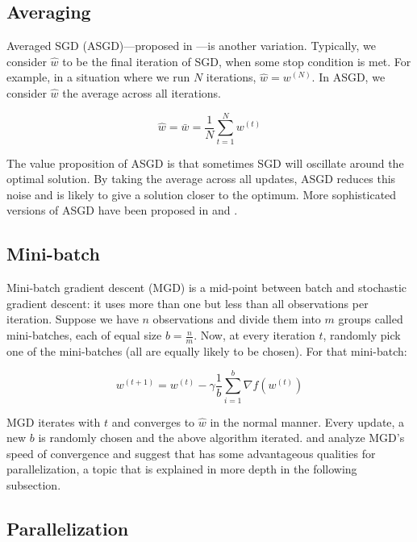 \documentclass{report}
\begin{document}
\subsection{Averaging}

Averaged SGD (ASGD)---proposed in
\cite{polyak1992acceleration}---is another variation. Typically, we consider
$\hat{w}$ to be the final iteration
of SGD, when some stop condition is met. For example, in a situation where we
run $N$ iterations, $\hat{w} = w^{(N)}$. In ASGD, we consider $\hat{w}$ 
the average across all iterations.

\begin{equation}
	\hat{w} = \bar{w} = \frac{1}{N} \sum_{t=1}^N w^{(t)}
\end{equation}

The value proposition of ASGD is that sometimes SGD will oscillate around the
optimal solution. By taking the average across all updates, ASGD reduces this
noise and is likely to give a solution closer to the optimum. More sophisticated
versions of ASGD have been proposed in 
\cite{zhang2004solving}
and 
\cite{xu2011towards}. 

\subsection{Mini-batch}

Mini-batch gradient descent (MGD) is a mid-point between batch
and stochastic gradient descent: it uses more than one but less than all
observations per iteration. Suppose we have $n$ observations and divide them
into $m$ groups called mini-batches, each of equal size $b=\frac{n}{m}$. Now, at
every iteration $t$, randomly pick one of the mini-batches (all are equally
likely to be chosen). For that mini-batch:

\begin{equation}
	w^{(t+1)} = w^{(t)} - \gamma \frac{1}{b} \sum_{i=1}^b \nabla f(w^{(t)})
\end{equation}

MGD iterates with $t$ and converges to $\hat{w}$ in the normal manner. Every
update, a new $b$ is randomly chosen and the above algorithm iterated. 
\cite{dekel2012optimal} and \cite{li2014efficient} analyze MGD's speed of
convergence and suggest that has some advantageous qualities for
parallelization, a topic that is explained in more depth in the following
subsection.

\subsection{Parallelization}
\end{document}
